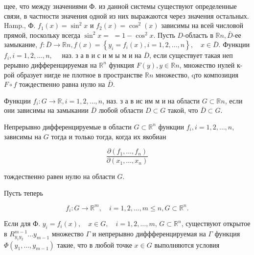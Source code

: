 \documentclass[10pt]{article}
\begin{document}
щее, что между значениями Ф. из данной системы существуют определенные связи, в частности значения одной из них выражаются через значения остальных. Hamp., Ф. $f_{1}(x)=\sin ^{2} x$ и $f_{2}(x)=\cos ^{2}(x)$ зависимы на всей числовой прямой, поскольку всегда $\sin ^{2} x=$ $=1-\cos ^{2} x$. Пусть $D$-область в $\mathbb{R} n, \bar{D}$-ее замыкание, $f: \bar{D} \longrightarrow \mathbb{R} n, f(x)=\left\{y_{i}=f_{i}(x), i=1,2, \ldots, n\right\}, \quad x \in \bar{D}$. Функции $f_{i}, i=1,2, \ldots, n, \quad$ наз. $з$ а в и с и м ы м и на $\bar{D}$, если существует такая неп рерывно дифференцируемая на $\mathbb{R}^{n}$ функция $F(y), y \in \mathbb{R} n$, множество нулей к-рой образует нигде не плотное в пространстве $\mathbb{R} n$ множество, qто композиция $F \circ f$ тождественно равна нулю на $\bar{D}$.



Функции $f_{i}: G \longrightarrow \mathbb{R}, i=1,2, \ldots, n$, наз. $з$ а в ис им м и на области $G \subset \mathbb{R} n$, если они зависимы на замыкании $\bar{D}$ любой области $D \subset G$ такой, что $\bar{D} \subset G$.



Непрерывно дифференцируемые в области $G \subset \mathbb{R}^{n}$ функции $f_{i}, i=1,2, \ldots, n$, зависимы на $G$ тогда и только тогда, когда их якобиан



\[

\frac{\partial\left(f_{1}, \ldots, f_{n}\right)}{\partial\left(x_{1}, \ldots, x_{n}\right)}

\]



тождественно равен нулю на области $G$.



Пусть теперь



\[

f_{i}: G \longrightarrow \mathbb{R}^{m}, \quad i=1,2, \ldots, m \leqslant n, G \subset \mathbb{R}^{n} .

\]



Если для Ф. $y_{i}=f_{i}(x), \quad x \in G, \quad i=1,2, \ldots, m$, $G \subset \mathbb{R}^{n}$, существуют открытое в $R_{y_{1} y_{2}}^{m-1} \ldots y_{m-1}$ множество $\Gamma$ и непрерывно диффференцируемая на $\Gamma$ функция $\Phi\left(y_{1}, \ldots, y_{m-1}\right)$ такие, что в любой точке $x \in G$ выполняются условия
\end{document}
